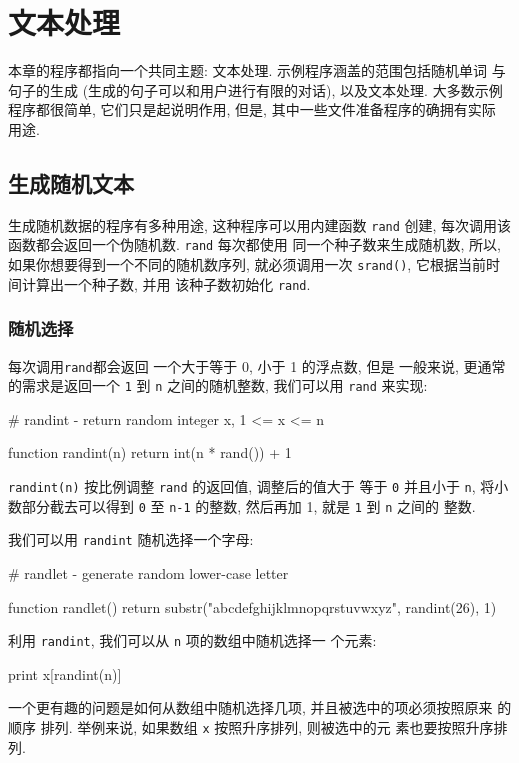 \chapter{文本处理}
\label{chap:processing_words}

本章的程序都指向一个共同主题: 文本处理. 示例程序涵盖的范围包括随机单词
与句子的生成 (生成的句子可以和用户进行有限的对话), 以及文本处理. 大多数示例
程序都很简单, 它们只是起说明作用, 但是, 其中一些文件准备程序的确拥有实际
用途.

\section{生成随机文本}
\label{sec:random_text_generation}

生成随机数据的程序有多种用途, 这种程序可以用内建函数 \texttt{rand}
创建, 每次调用该函数都会返回一个伪随机数. \texttt{rand} 每次都使用
同一个种子数来生成随机数, 所以, 如果你想要得到一个不同的随机数序列,
就必须调用一次 \texttt{srand()}, 它根据当前时间计算出一个种子数, 并用
该种子数初始化 \texttt{rand}.

\subsection{随机选择}
\label{subsec:random_choices}

 每次调用\texttt{rand}都会返回 一个大于等于 0, 小于 1 的浮点数, 但是
一般来说, 更通常的需求是返回一个 \texttt{1} 到 \texttt{n} 之间的随机整数,
我们可以用 \texttt{rand} 来实现:
\begin{awkcode}
    # randint - return random integer x, 1 <= x <= n

    function randint(n) {
        return int(n * rand()) + 1
    }
\end{awkcode}
\texttt{randint(n)} 按比例调整 \texttt{rand} 的返回值, 调整后的值大于
等于 \texttt{0} 并且小于 \texttt{n}, 将小数部分截去可以得到 \texttt{0}
至 \texttt{n-1} 的整数, 然后再加 1, 就是 \texttt{1} 到 \texttt{n} 之间的
整数.

我们可以用 \texttt{randint} 随机选择一个字母:
\begin{awkcode}
    # randlet - generate random lower-case letter

    function randlet() {
        return substr("abcdefghijklmnopqrstuvwxyz", randint(26), 1)
    }
\end{awkcode}

利用 \texttt{randint}, 我们可以从 \texttt{n} 项的数组中随机选择一
个元素:
\begin{awkcode}
    print x[randint(n)]
\end{awkcode}
一个更有趣的问题是如何从数组中随机选择几项, 并且被选中的项必须按照原来
的顺序 排列. 举例来说, 如果数组 \texttt{x} 按照升序排列, 则被选中的元
素也要按照升序排列.


